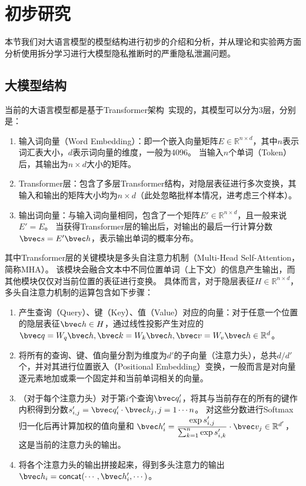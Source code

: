 \section{初步研究}
本节我们对大语言模型的模型结构进行初步的介绍和分析，并从理论和实验两方面分析使用拆分学习进行大模型隐私推断时的严重隐私泄漏问题。

\subsection{大模型结构}
当前的大语言模型都是基于Transformer架构~\cite{vaswani_2017_attention}实现的，其模型可以分为3层，分别是：
\begin{enumerate}
    \item 输入词向量（Word Embedding）：即一个嵌入向量矩阵$E \in \mathbb R^{n\times d}$，其中$n$表示词汇表大小，$d$表示词向量的维度，一般为4096。
    当输入$n$个单词（Token）后，其输出为$n \times d$大小的矩阵。
    \item Transformer层：包含了多层Transformer结构，对隐层表征进行多次变换，其输入和输出的矩阵大小均为$n \times d$（此处忽略批样本情况，进考虑三个样本）。
    \item 输出词向量：与输入词向量相同，包含了一个矩阵$E' \in \mathbb R^{n\times d}$，且一般来说$E' = E$。
    当获得Transformer层的输出后，对输出的最后一行计算分数$\bvec  s = E'\bvec h$，表示输出单词的概率分布。
\end{enumerate}

其中Transformer层的关键模块是多头自注意力机制（Multi-Head Self-Attention，简称MHA）。
%
该模块会融合文本中不同位置单词（上下文）的信息产生输出，而其他模块仅仅对当前位置的表征进行变换。
%
具体而言，对于隐层表征$H \in \mathbb R^{n\times d}$，多头自注意力机制的运算包含如下步骤：
\begin{enumerate}
    \item 产生查询（Query）、键（Key）、值（Value）对应的向量：对于任意一个位置的隐层表征$\bvec h \in H$，通过线性投影产生对应的$\bvec q = W_q \bvec h, \bvec k = W_k \bvec h, \bvec v = W_v \bvec h \in \mathbb R^d$。
    \item 将所有的查询、键、值向量分割为维度为$d'$的子向量（注意力头），总共$d/d'$个，并对其进行位置嵌入（Positional Embedding）变换，一般而言是对向量逐元素地加或乘一个固定并和当前单词相关的向量。
    \item （对于每个注意力头）对于第$i$个查询$\bvec q_i'$，将其与当前存在的所有的键作内积得到分数$s'_{i, j} = \bvec q_i' \cdot \bvec k_j, j = 1\cdots n$。
    对这些分数进行Softmax归一化后再计算加权的值向量和 $\bvec h'_i = \dfrac{\exp {s'_{i, j}}}{\sum_{k = 1}^n \exp {s'_{i, k}}} \cdot \bvec v_j \in \mathbb R^{d'}$，这是当前的注意力头的输出。
    \item 将各个注意力头的输出拼接起来，得到多头注意力的输出$\bvec h_i = \mathsf{concat}(\cdots, \bvec h'_i, \cdots)$。
\end{enumerate}

